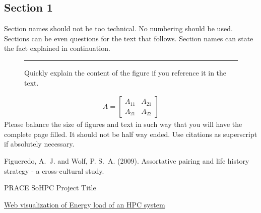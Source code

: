 \documentclass[a4paper, twoside]{article}
\begin{document}
\begin{multicols}{3}
\section*{Section 1}
Section names should not be too technical. No numbering should be used. Sections can be even questions for the text that follows. Section names can state the fact explained in continuation.

\begin{figure}[H]
  \color{yellow}\rule{\linewidth}{3cm}\color{black}
  \caption{Quickly explain the content of the figure if you reference it in
    the text.}
  \label{fig:vortex}
\end{figure}


\begin{align}
 A = 
 \begin{bmatrix}
 A_{11} & A_{21} \\
 A_{21} & A_{22}
 \end{bmatrix}
 \end{align}
Please balance the size of figures and text in such way that you will have the complete page filled. It should not be half way ended. Use citations as superscript\cite{Figueredo:2009dg} if absolutely necessary.
\newcommand{\sohpcinfo}[1]{\par\vspace{1ex}\footnotesize
  \textcolor{prace-lightblue}{PRACE SoHPC}%
  \textcolor{prace-darkblue}{#1}\\[0.5ex]\scriptsize
}

\renewcommand\refname{\usefont{OT1}{phv}{m}{n}\selectfont\small{References}}
\begin{thebibliography}{9}
\vspace*{-1ex}  %
\scriptsize
{}
Figueredo, A.~J. and Wolf, P. S.~A. (2009).
\newblock Assortative pairing and life history strategy - a cross-cultural
  study.
\end{thebibliography}

\vfill
\noindent\begin{minipage}[b]{0.7\linewidth}
\begin{flushleft}
  \selectfont
  \sohpcinfo{Project Title}
  \href{https://summerofhpc.prace-ri.eu/web-visualization-of-energy-load-of-an-hpc-system/}{Web visualization of Energy load of an HPC system}
  

\end{flushleft}
\end{minipage}
\end{multicols}
\end{document}
